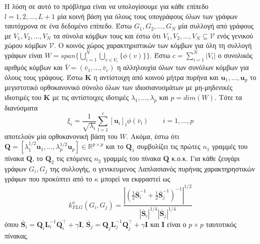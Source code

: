Η λύση σε αυτό το πρόβλημα είναι να υπολογίσουμε για κάθε επίπεδο $l=1,2,\ldots,L+1$ μία κοινή βάση για όλους τους υπογράφους όλων των γράφων ταυτόχρονα σε ένα δεδομένο επίπεδο.
Έστω $G_1, G_2, \ldots, G_N$ μία συλλογή από γράφους με $V_1, V_2, \ldots, V_N$ τα σύνολα κόμβων τους και έστω ότι $V_1, V_2, \ldots, V_N \subseteq \mathcal{V}$ ενός γενικού χώρου κόμβων $\mathcal{V}$.
Ο κοινός χώρος χαρακτηριστικών των κόμβων για όλη τη συλλογή γράφων είναι $W = span \big\{ \bigcup_{i=1}^N \bigcup_{v \in V_i} \{ \phi(v) \} \big\}$.
Έστω $c = \sum_{i=1}^N |V_i|$ ο συνολικός αριθμός κόμβων και $\bar{V} = (\bar{v}_1, \ldots, \bar{v}_c)$ η αλληλουχία όλων των συνόλων κόμβων για όλους τους γράφους.
Έστω $\mathbf{K}$ η αντίστοιχη από κοινού μήτρα πυρήνα και $\mathbf{u}_1, \ldots, \mathbf{u}_p$ το μεγιστοτικό ορθοκανονικό σύνολο όλων των ιδιοσιανυσμάτων με μη-μηδενικές ιδιοτιμές του $\mathbf{K}$ με τις αντίστοιχες ιδοτιμές $\lambda_1,\ldots,\lambda_p$ και $p=dim(W)$.
Τότε τα διανύσματα
\begin{equation*}
    \xi_i = \frac{1}{\sqrt{\lambda_i}} \sum_{l=1}^c [\mathbf{u}_i]_l \phi(\bar{v}_l) \qquad i=1,\ldots,p
\end{equation*}
αποτελούν μία ορθοκανονική βάση του $W$.
Ακόμα, έστω ότι $\mathbf{Q} = [ \lambda_1^{1/2} \mathbf{u}_1, \ldots, \lambda_p^{1/2} \mathbf{u}_p ] \in \mathbb{R}^{p \times p}$ και το $\mathbf{Q}_1$ συμβολίζει τις πρώτες $n_1$ γραμμές του πίνακα $\mathbf{Q}$, το $\mathbf{Q}_2$ τις επόμενες $n_2 $ γραμμές του πίνακα $\mathbf{Q}$ κ.ο.κ.
Για κάθε ζευγάρι γράφων $G_i, G_j$ της συλλογής, ο γενικευμενος Λαπλασιανός πυρήνας χαρακτηρηστικών γράφων που προκύπτει από το $\kappa$ μπορεί να εκφραστεί ως
\begin{equation*}
    k_{FLG}^\kappa(G_i, G_j) = \frac{| (\frac{1}{2} \bar{\mathbf{S}}_i^{-1} + \frac{1}{2} \bar{\mathbf{S}}_j^{-1} )^{-1} |^{1/2}}{|\bar{\mathbf{S}}_i|^{1/4} |\bar{\mathbf{S}}_j|^{1/4}} 
\end{equation*}
όπου $\bar{\mathbf{S}}_i = \mathbf{Q}_i \mathbf{L}_i^{-1} \mathbf{Q}_i^\top + \gamma \mathbf{I}$, $\bar{\mathbf{S}}_j = \mathbf{Q}_j \mathbf{L}_j^{-1} \mathbf{Q}_j^\top + \gamma \mathbf{I}$ και $\mathbf{I}$ είναι ο $p \times p$ ταυτοτικός πίνακας.

